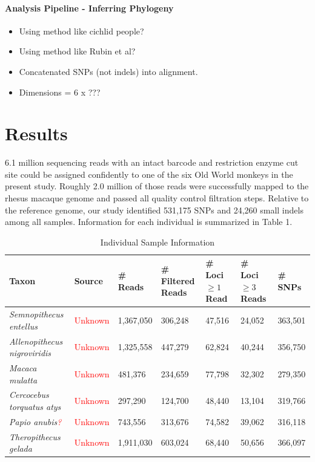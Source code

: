 \documentclass[12pt]{article}
\begin{document}
\paragraph{Analysis Pipeline - Inferring Phylogeny}
\begin{itemize}
	\item Using method like cichlid people?
	\item Using method like Rubin et al? 
	\item Concatenated SNPs (not indels) into alignment. 
	\item Dimensions = 6 x ???
\end{itemize}

\section{Results}


6.1 million sequencing reads with an intact barcode and restriction enzyme cut site could be assigned confidently to one of the six Old World monkeys in the present study. Roughly 2.0 million of those reads were successfully mapped to the rhesus macaque genome and passed all quality control filtration steps. Relative to the reference genome, our study identified 531,175 SNPs and 24,260 small indels among all samples. Information for each individual is summarized in Table 1. 

\begin{table}[h]
\caption{Individual Sample Information}
\begin{center}
	\small
	\begin{tabular}{ p{3cm} || l || p{1.75cm} | p{1.75cm} || p{1.75cm} | p{1.75cm} | l }
		\hline
		Taxon & Source & \# Reads & \# Filtered Reads & \# Loci $\ge 1$ Read & \# Loci $\ge 3$ Reads & \# SNPs \\ \hline\hline
		\emph{Semnopithecus entellus} & \textcolor{red}{Unknown} & 1,367,050 & 306,248 & 47,516 & 24,052 & 363,501 \\ \hline
		\emph{Allenopithecus nigroviridis} & \textcolor{red}{Unknown} & 1,325,558 & 447,279 & 62,824 & 40,244 & 356,750 \\ \hline
		\emph{Macaca mulatta} & \textcolor{red}{Unknown} & 481,376 & 234,659 & 77,798 & 32,302 & 279,350 \\ \hline
		\emph{Cercocebus torquatus atys} & \textcolor{red}{Unknown} & 297,290 & 124,700 & 48,440 & 13,104 & 319,766 \\ \hline
		\emph{Papio anubis\textcolor{red}{?}} & \textcolor{red}{Unknown} & 743,556 & 313,676 & 74,582 & 39,062 & 316,118 \\ \hline
		\emph{Theropithecus gelada} & \textcolor{red}{Unknown} & 1,911,030 & 603,024 & 68,440 & 50,656 & 366,097 \\
		\hline
	\end{tabular}
\end{center}
\end{table}
\end{document}

